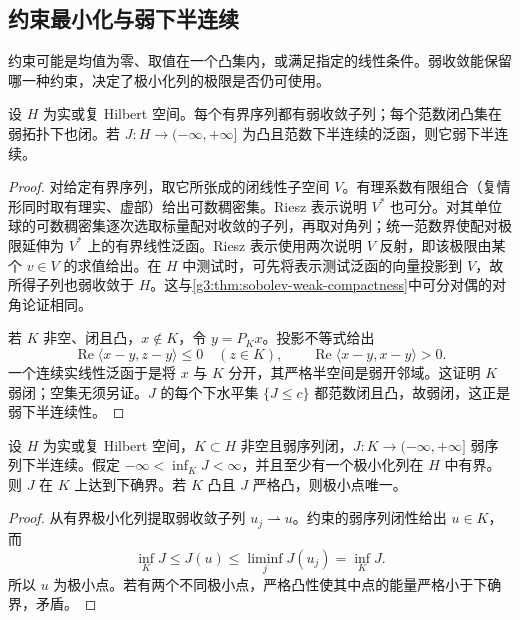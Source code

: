 \subsection{约束最小化与弱下半连续}
\label{g3:subsec:1201:03}
约束可能是均值为零、取值在一个凸集内，或满足指定的线性条件。弱收敛能保留哪一种约束，决定了极小化列的极限是否仍可使用。

\begin{lemma}\label{g3:lem:hilbert-weak-minimization-tools}
	设 \(H\) 为实或复 Hilbert 空间。每个有界序列都有弱收敛子列；每个范数闭凸集在弱拓扑下也闭。若 \(J:H\to(-\infty,+\infty]\) 为凸且范数下半连续的泛函，则它弱下半连续。
\end{lemma}
\begin{proof}
	对给定有界序列，取它所张成的闭线性子空间 \(V\)。有理系数有限组合（复情形同时取有理实、虚部）给出可数稠密集。Riesz 表示说明 \(V^*\) 也可分。对其单位球的可数稠密集逐次选取标量配对收敛的子列，再取对角列；统一范数界使配对极限延伸为 \(V^*\) 上的有界线性泛函。Riesz 表示使用两次说明 \(V\) 反射，即该极限由某个 \(v\in V\) 的求值给出。在 \(H\) 中测试时，可先将表示测试泛函的向量投影到 \(V\)，故所得子列也弱收敛于 \(H\)。这与\cref{g3:thm:sobolev-weak-compactness}中可分对偶的对角论证相同。

	若 \(K\) 非空、闭且凸，\(x\notin K\)，令 \(y=P_Kx\)。投影不等式给出
	\[
		\operatorname{Re}\langle x-y,z-y\rangle\le0\quad(z\in K),
		\qquad \operatorname{Re}\langle x-y,x-y\rangle>0.
	\]
	一个连续实线性泛函于是将 \(x\) 与 \(K\) 分开，其严格半空间是弱开邻域。这证明 \(K\) 弱闭；空集无须另证。\(J\) 的每个下水平集 \(\{J\le c\}\) 都范数闭且凸，故弱闭，这正是弱下半连续性。
\end{proof}

\begin{theorem}\label{g3:thm:direct-method-hilbert}
	设 \(H\) 为实或复 Hilbert 空间，\(K\subset H\) 非空且弱序列闭，\(J:K\to(-\infty,+\infty]\) 弱序列下半连续。假定 \(-\infty<\inf_KJ<\infty\)，并且至少有一个极小化列在 \(H\) 中有界。则 \(J\) 在 \(K\) 上达到下确界。若 \(K\) 凸且 \(J\) 严格凸，则极小点唯一。
\end{theorem}
\begin{proof}
	从有界极小化列提取弱收敛子列 \(u_j\rightharpoonup u\)。约束的弱序列闭性给出 \(u\in K\)，而
	\[
		\inf_KJ\le J(u)\le\liminf_jJ(u_j)=\inf_KJ.
	\]
	所以 \(u\) 为极小点。若有两个不同极小点，严格凸性使其中点的能量严格小于下确界，矛盾。
\end{proof}


